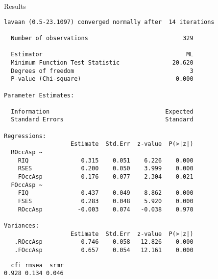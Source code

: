 \documentclass[10pt,ignorenonframetext,]{beamer}
\begin{document}
\begin{frame}[fragile]{Results}

\tiny

\begin{verbatim}
lavaan (0.5-23.1097) converged normally after  14 iterations

  Number of observations                           329

  Estimator                                         ML
  Minimum Function Test Statistic               20.620
  Degrees of freedom                                 3
  P-value (Chi-square)                           0.000

Parameter Estimates:

  Information                                 Expected
  Standard Errors                             Standard

Regressions:
                   Estimate  Std.Err  z-value  P(>|z|)
  ROccAsp ~                                           
    RIQ               0.315    0.051    6.226    0.000
    RSES              0.200    0.050    3.999    0.000
    FOccAsp           0.176    0.077    2.304    0.021
  FOccAsp ~                                           
    FIQ               0.437    0.049    8.862    0.000
    FSES              0.283    0.048    5.920    0.000
    ROccAsp          -0.003    0.074   -0.038    0.970

Variances:
                   Estimate  Std.Err  z-value  P(>|z|)
   .ROccAsp           0.746    0.058   12.826    0.000
   .FOccAsp           0.657    0.054   12.161    0.000
\end{verbatim}

\begin{verbatim}
  cfi rmsea  srmr 
0.928 0.134 0.046 
\end{verbatim}

\end{frame}
\end{document}
